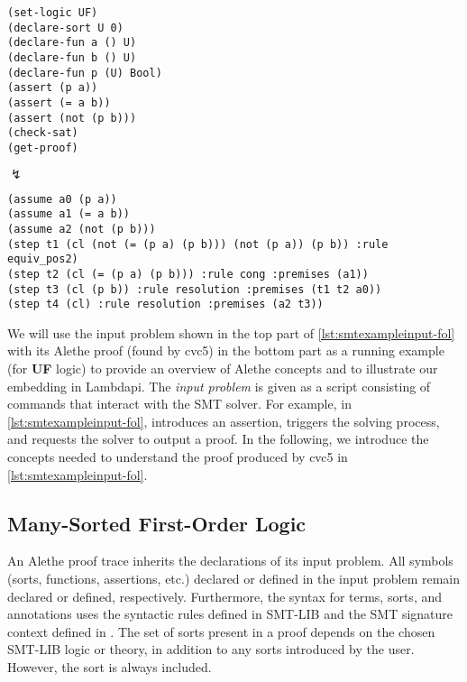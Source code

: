 \begin{lstlisting}[language=SMT]
(set-logic UF)
(declare-sort U 0)
(declare-fun a () U)
(declare-fun b () U)
(declare-fun p (U) Bool)
(assert (p a))
(assert (= a b))
(assert (not (p b)))
(check-sat)
(get-proof)
\end{lstlisting}

\begin{center}
$\lightning$
\end{center}

\begin{lstlisting}[language=SMT,caption={Running example: an SMT problem and its Alethe proof found by cvc5.},label={lst:smtexampleinput-fol}]
(assume a0 (p a))
(assume a1 (= a b))
(assume a2 (not (p b)))
(step t1 (cl (not (= (p a) (p b))) (not (p a)) (p b)) :rule equiv_pos2)
(step t2 (cl (= (p a) (p b))) :rule cong :premises (a1))
(step t3 (cl (p b)) :rule resolution :premises (t1 t2 a0))
(step t4 (cl) :rule resolution :premises (a2 t3))
\end{lstlisting}


We will use the input problem shown in the top part of \cref{lst:smtexampleinput-fol} with its Alethe proof (found by cvc5) in the bottom part as a running example (for \textbf{UF} logic) to provide an overview of Alethe concepts and to illustrate our embedding in Lambdapi.
The \emph{input problem} is given as a script consisting of commands that interact with the SMT solver.
For example, in \cref{lst:smtexampleinput-fol},  introduces an assertion,  triggers the solving process, and  requests the solver to output a proof.
In the following, we introduce the concepts needed to understand the proof produced by cvc5 in \cref{lst:smtexampleinput-fol}.

\subsection{Many-Sorted First-Order Logic}

An Alethe proof trace inherits the declarations of its input problem. All symbols (sorts, functions, assertions, etc.) declared or defined in the input problem remain declared or defined, respectively.
Furthermore, the syntax for terms, sorts, and annotations uses the syntactic rules defined in SMT-LIB \cite[\S 3]{smtlib} and the SMT signature context defined in \cite[\S 5.1 and \S 5.2]{smtlib}.
The set of sorts present in a proof depends on the chosen SMT-LIB logic or theory, in addition to any sorts introduced by the user.
However, the sort  is always included.


